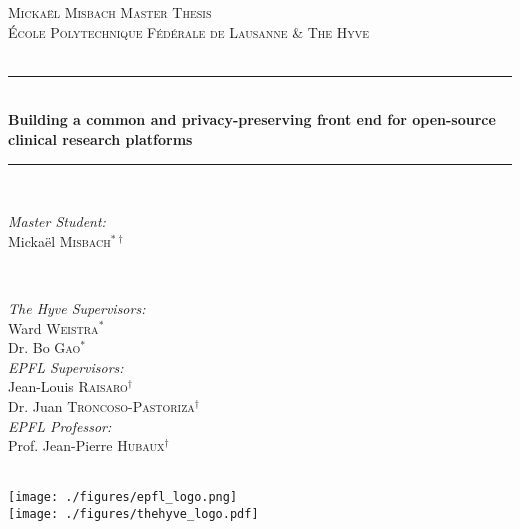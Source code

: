 \begin{titlepage}

\newcommand{\HRule}{\rule{\linewidth}{0.5mm}}
\center
 
\textsc{\LARGE Mickaël Misbach Master Thesis}\\[0.5cm]

\textsc{\Large École Polytechnique Fédérale de Lausanne \& The Hyve}\\[0.5cm] 
\textsc{\large \reportTitle}\\[0.5cm]

\HRule \\[0.4cm]
{ \huge \bfseries Building a common and privacy-preserving front end for open-source clinical research platforms}\\[0.4cm]
\HRule \\[1cm]
 
\begin{minipage}{0.4\textwidth}
\begin{flushleft} \large
\emph{Master Student:}\\
Mickaël \textsc{Misbach}$^{*\dagger}$\\
\end{flushleft}
\end{minipage}
~
\begin{minipage}{0.4\textwidth}
\begin{flushright} \large
\emph{The Hyve Supervisors:} \\
Ward \textsc{Weistra}$^*$\\
Dr. Bo \textsc{Gao}$^*$\\[\baselineskip]
\emph{EPFL Supervisors:} \\
Jean-Louis \textsc{Raisaro}$^\dagger$\\
Dr. Juan \textsc{Troncoso-Pastoriza}$^\dagger$\\[\baselineskip]
\emph{EPFL Professor:} \\
Prof. Jean-Pierre \textsc{Hubaux}$^\dagger$\\
\end{flushright}
\end{minipage}\\[1.5cm]


\texttt{[image: ./figures/epfl\_logo.png]}\\
\texttt{[image: ./figures/thehyve\_logo.pdf]}\\


\end{titlepage}
